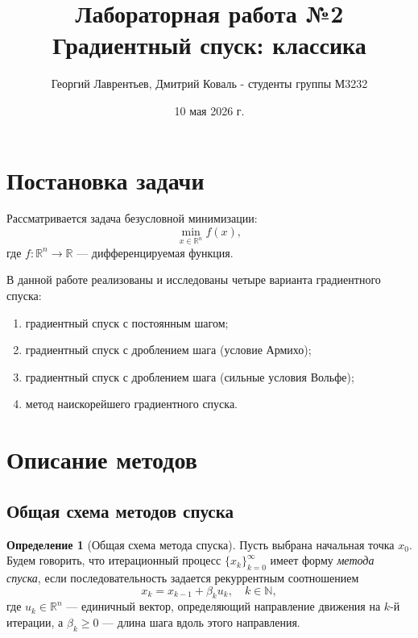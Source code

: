 \documentclass[a4paper,12pt]{article}
\title{Лабораторная работа №2\\Градиентный спуск: классика}
\author{Георгий Лаврентьев, Дмитрий Коваль - студенты группы М3232}
\date{10 мая 2026 г.}
\newcommand{\R}{\mathbb{R}}
\theoremstyle{definition}
\newtheorem{definition}{Определение}[section]
\begin{document}
\maketitle
\vspace{-20pt}

\section{Постановка задачи}

Рассматривается задача безусловной минимизации:
\[
    \min_{x \in \R^n} f(x),
\]
где $f \colon \R^n \to \R$ — дифференцируемая функция.

В данной работе реализованы и исследованы четыре варианта градиентного спуска:
\begin{enumerate}
    \item градиентный спуск с постоянным шагом;
    \item градиентный спуск с дроблением шага (условие Армихо);
    \item градиентный спуск с дроблением шага (сильные условия Вольфе);
    \item метод наискорейшего градиентного спуска.
\end{enumerate}

\section{Описание методов}

\subsection{Общая схема методов спуска}

\begin{definition}[Общая схема метода спуска]
    Пусть выбрана начальная точка $x_0$. Будем говорить, что итерационный процесс
    $\{x_k\}_{k=0}^{\infty}$ имеет форму \emph{метода спуска}, если последовательность
    задается рекуррентным соотношением
    \[
        x_k = x_{k-1} + \beta_k u_k, \quad k \in \mathbb{N},
    \]
    где $u_k \in \mathbb{R}^n$ — единичный вектор, определяющий направление движения
    на $k$-й итерации, а $\beta_k \geq 0$ — длина шага вдоль этого направления.
\end{definition}
\end{document}
